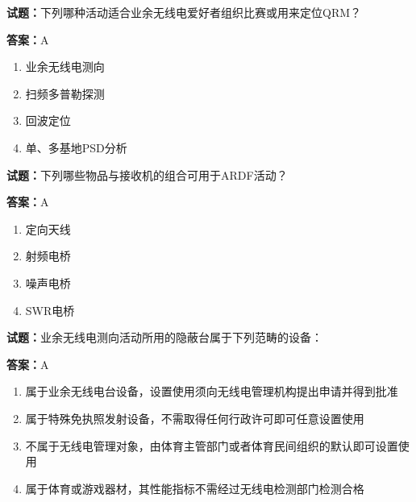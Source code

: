 \documentclass{ctexbook}
\begin{document}
\vspace{1em}

\textbf{试题：}下列哪种活动适合业余无线电爱好者组织比赛或用来定位QRM？ 

\textbf{答案：}A 

\begin{enumerate}[leftmargin=3em]
  \item 业余无线电测向 

  \item 扫频多普勒探测 

  \item 回波定位 

  \item 单、多基地PSD分析 

\end{enumerate}





\vspace{1em}

\textbf{试题：}下列哪些物品与接收机的组合可用于ARDF活动？ 

\textbf{答案：}A 

\begin{enumerate}[leftmargin=3em]
  \item 定向天线 

  \item 射频电桥 

  \item 噪声电桥 

  \item SWR电桥 

\end{enumerate}





\vspace{1em}

\textbf{试题：}业余无线电测向活动所用的隐蔽台属于下列范畴的设备： 

\textbf{答案：}A 

\begin{enumerate}[leftmargin=3em]
  \item 属于业余无线电台设备，设置使用须向无线电管理机构提出申请并得到批准 

  \item 属于特殊免执照发射设备，不需取得任何行政许可即可任意设置使用 

  \item 不属于无线电管理对象，由体育主管部门或者体育民间组织的默认即可设置使用 

  \item 属于体育或游戏器材，其性能指标不需经过无线电检测部门检测合格 

\end{enumerate}
\end{document}
